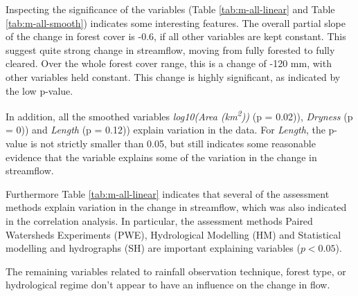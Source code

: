 \documentclass[]{elsarticle} %
\begin{document}
Inspecting the significance of the variables (Table \ref{tab:m-all-linear} and Table \ref{tab:m-all-smooth}) indicates some interesting features. The overall partial slope of the change in forest cover is -0.6, if all other variables are kept constant. This suggest quite strong change in streamflow, moving from fully forested to fully cleared. Over the whole forest cover range, this is a change of -120 mm, with other variables held constant. This change is highly significant, as indicated by the low p-value.

In addition, all the smoothed variables \emph{log10(Area (km\textsuperscript{2}))} (p = 0.02)), \emph{Dryness} (p = 0)) and \emph{Length} (p = 0.12)) explain variation in the data. For \emph{Length}, the p-value is not strictly smaller than 0.05, but still indicates some reasonable evidence that the variable explains some of the variation in the change in streamflow.

Furthermore Table \ref{tab:m-all-linear} indicates that several of the assessment methods explain variation in the change in streamflow, which was also indicated in the correlation analysis. In particular, the assessment methods Paired Watersheds Experiments (PWE), Hydrological Modelling (HM) and Statistical modelling and hydrographs (SH) are important explaining variables (\(p < 0.05\)).

The remaining variables related to rainfall observation technique, forest type, or hydrological regime don't appear to have an influence on the change in flow.
\end{document}
